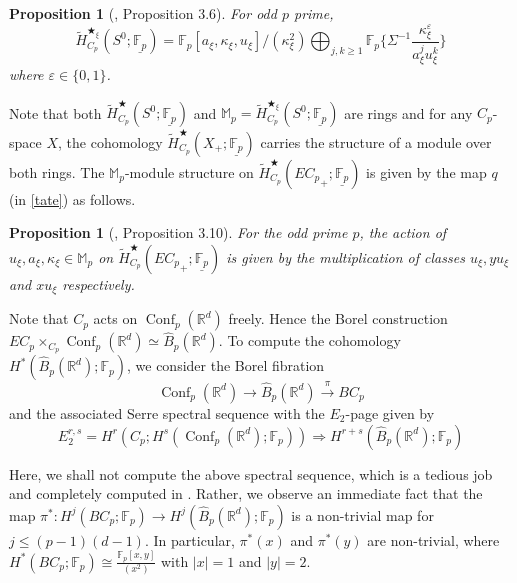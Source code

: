\documentclass[a4paper,leqno,11pt]{amsart}
\renewcommand{\epsilon}{\varepsilon}
\newcommand{\bM}{\mathbb{M}}
\newcommand{\bF}{\mathbb{F}}
\newcommand{\bR}{\mathbb{R}}
\newcommand{\bFp}{\bF_p}
\newcommand{\uFp}{\underline{\bFp}}
\newcommand{\Conf}{\operatorname{Conf}}
\newcommand{\bs}{\bigstar}
\newcommand{\bsc}{\bs_\xi}
\theoremstyle{plain}
\newtheorem{prop}[theorem]{Proposition}
\theoremstyle{definition}
\theoremstyle{remark}
\begin{document}
\begin{prop}[\cite{BG21}, Proposition 3.6]
    For odd $p$ prime, 
    \[
     \tilde{H}^{\bsc}_{C_{p}}(S^{0};\uFp)=\bFp[a_{\xi},\kappa_{\xi},u_{\xi}]/(\kappa^{2}_{\xi}) \bigoplus_{j,k\geq 1} \bFp\{\Sigma^{-1}\frac{\kappa^{\epsilon}_{\xi}}{a^{j}_{\xi}u^{k}_{\xi}}\}
    \]
    where $\epsilon\in \{0,1\}$.
\end{prop}



Note that both  $\tilde{H}^{\bs}_{C_{p}}(S^{0};\uFp)$ and $\bM_p= \tilde{H}^{\bsc}_{C_{p}}(S^{0};\uFp)$ are rings and for any $C_p$-space $X$, the cohomology $\tilde{H}^{\bs}_{C_{p}}(X_+;\uFp)$ carries the structure of a module over both rings.  The $\mathbb{M}_{p}$-module structure on $\tilde{H}^\bs_{C_p}({EC_p}_+; \uFp)$ is given by the map $q$ (in \eqref{tate}) as follows.
\begin{prop}[\cite{BG21}, Proposition 3.10]
     For the odd prime $p$, the action of $u_{\xi},a_{\xi},\kappa_{\xi} \in \bM_p$ on $\tilde{H}^{\bigstar}_{C_p}({EC_{p}}_{+};\uFp)$  is given by the multiplication of classes $u_{\xi}, yu_{\xi}$ and $xu_{\xi}$ respectively.
 \end{prop}

 
Note that $C_p$ acts on $\Conf_p(\bR^d)$ freely. Hence the Borel construction $EC_p \times_{C_p} \Conf_p(\bR^d) \simeq \widehat{B}_p(\bR^d).$ To compute the cohomology $H^\ast(\widehat{B}_p(\bR^d); \bFp)$, we consider the Borel fibration 
\[
\Conf_p(\bR^d) \to \widehat{B}_p(\bR^d) \stackrel{\pi}{\to} BC_p
\]
 and the associated Serre spectral sequence with the $E_2$-page given by
 \[
 E_2^{r,s} = H^r(C_p; H^s(\Conf_p(\bR^d); \bFp)) \Rightarrow H^{r+s}(\widehat{B}_p(\bR^d); \bFp)
 \]

Here, we shall not compute the above spectral sequence, which is a tedious job and completely computed in  \cite{BLZ}. Rather, we observe an immediate fact that the map $\pi^\ast \colon H^j(BC_p; \bFp) \to H^j(\widehat{B}_p(\bR^d); \bFp)$ is a non-trivial map for $j \le (p-1)(d-1).$ In particular, $\pi^\ast(x)$ and $\pi^\ast(y)$ are non-trivial, where $H^\ast(BC_p; \bFp)\cong \frac{\bFp[x, y]}{(x^2)}$ with $|x|=1$ and $|y|=2.$
\end{document}
